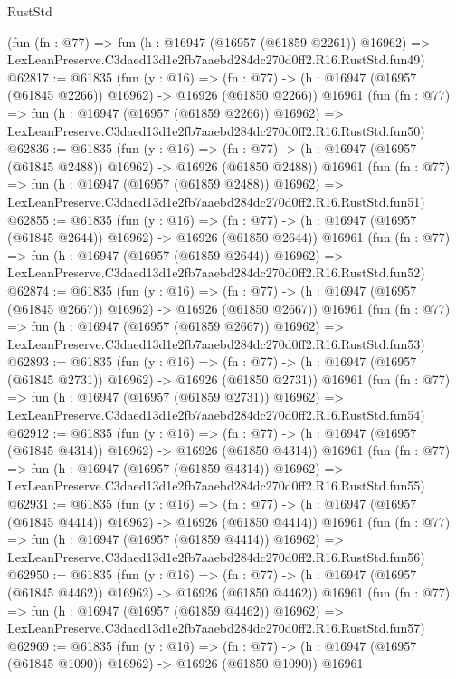 \begin{lexlean}{RustStd}
\begin{coremodule}
    (fun (fn : @77) =>
    fun (h : @16947 (@16957 (@61859 @2261)) @16962) =>
    LexLeanPreserve.C3daed13d1e2fb7aaebd284dc270d0ff2.R16.RustStd.fun49)
@62817 := @61835
    (fun (y : @16) =>
    (fn : @77) -> (h : @16947 (@16957 (@61845 @2266)) @16962) -> @16926 (@61850 @2266))
    @16961
    (fun (fn : @77) =>
    fun (h : @16947 (@16957 (@61859 @2266)) @16962) =>
    LexLeanPreserve.C3daed13d1e2fb7aaebd284dc270d0ff2.R16.RustStd.fun50)
@62836 := @61835
    (fun (y : @16) =>
    (fn : @77) -> (h : @16947 (@16957 (@61845 @2488)) @16962) -> @16926 (@61850 @2488))
    @16961
    (fun (fn : @77) =>
    fun (h : @16947 (@16957 (@61859 @2488)) @16962) =>
    LexLeanPreserve.C3daed13d1e2fb7aaebd284dc270d0ff2.R16.RustStd.fun51)
@62855 := @61835
    (fun (y : @16) =>
    (fn : @77) -> (h : @16947 (@16957 (@61845 @2644)) @16962) -> @16926 (@61850 @2644))
    @16961
    (fun (fn : @77) =>
    fun (h : @16947 (@16957 (@61859 @2644)) @16962) =>
    LexLeanPreserve.C3daed13d1e2fb7aaebd284dc270d0ff2.R16.RustStd.fun52)
@62874 := @61835
    (fun (y : @16) =>
    (fn : @77) -> (h : @16947 (@16957 (@61845 @2667)) @16962) -> @16926 (@61850 @2667))
    @16961
    (fun (fn : @77) =>
    fun (h : @16947 (@16957 (@61859 @2667)) @16962) =>
    LexLeanPreserve.C3daed13d1e2fb7aaebd284dc270d0ff2.R16.RustStd.fun53)
@62893 := @61835
    (fun (y : @16) =>
    (fn : @77) -> (h : @16947 (@16957 (@61845 @2731)) @16962) -> @16926 (@61850 @2731))
    @16961
    (fun (fn : @77) =>
    fun (h : @16947 (@16957 (@61859 @2731)) @16962) =>
    LexLeanPreserve.C3daed13d1e2fb7aaebd284dc270d0ff2.R16.RustStd.fun54)
@62912 := @61835
    (fun (y : @16) =>
    (fn : @77) -> (h : @16947 (@16957 (@61845 @4314)) @16962) -> @16926 (@61850 @4314))
    @16961
    (fun (fn : @77) =>
    fun (h : @16947 (@16957 (@61859 @4314)) @16962) =>
    LexLeanPreserve.C3daed13d1e2fb7aaebd284dc270d0ff2.R16.RustStd.fun55)
@62931 := @61835
    (fun (y : @16) =>
    (fn : @77) -> (h : @16947 (@16957 (@61845 @4414)) @16962) -> @16926 (@61850 @4414))
    @16961
    (fun (fn : @77) =>
    fun (h : @16947 (@16957 (@61859 @4414)) @16962) =>
    LexLeanPreserve.C3daed13d1e2fb7aaebd284dc270d0ff2.R16.RustStd.fun56)
@62950 := @61835
    (fun (y : @16) =>
    (fn : @77) -> (h : @16947 (@16957 (@61845 @4462)) @16962) -> @16926 (@61850 @4462))
    @16961
    (fun (fn : @77) =>
    fun (h : @16947 (@16957 (@61859 @4462)) @16962) =>
    LexLeanPreserve.C3daed13d1e2fb7aaebd284dc270d0ff2.R16.RustStd.fun57)
@62969 := @61835
    (fun (y : @16) =>
    (fn : @77) -> (h : @16947 (@16957 (@61845 @1090)) @16962) -> @16926 (@61850 @1090))
    @16961

\end{coremodule}
\end{lexlean}
